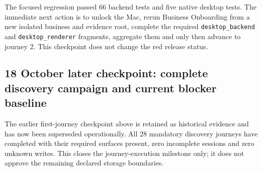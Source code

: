\documentclass[11pt]{article}
\newcommand{\code}[1]{\texttt{#1}}
\begin{document}
The focused regression passed 66 backend tests and five native desktop tests. The immediate next action is to unlock the Mac, rerun Business Onboarding from a new isolated business and evidence root, complete the required \code{desktop\_backend} and \code{desktop\_renderer} fragments, aggregate them and only then advance to journey 2. This checkpoint does not change the red release status.

\subsection{18 October later checkpoint: complete discovery campaign and current blocker baseline}

The earlier first-journey checkpoint above is retained as historical evidence and has now been superseded operationally. All 28 mandatory discovery journeys have completed with their required surfaces present, zero incomplete sessions and zero unknown writes. This closes the journey-execution milestone only; it does not approve the remaining declared storage boundaries.
\end{document}
